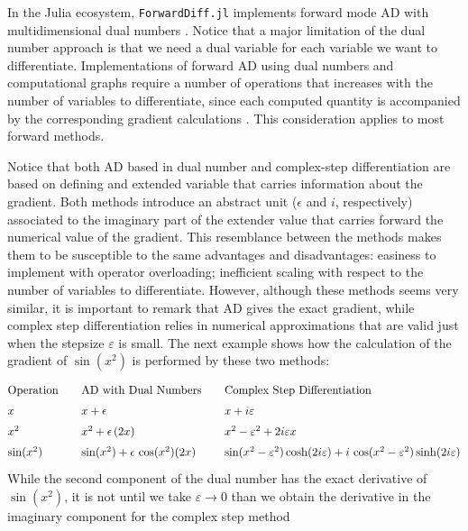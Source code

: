 In the Julia ecosystem, \texttt{ForwardDiff.jl} implements forward mode AD with multidimensional dual numbers \cite{RevelsLubinPapamarkou2016}. 
Notice that a major limitation of the dual number approach is that we need a dual variable for each variable we want to differentiate. 
Implementations of forward AD using dual numbers and computational graphs require a number of operations that increases with the number of variables to differentiate, since each computed quantity is accompanied by the corresponding gradient calculations \cite{Griewack-on-AD}. 
This consideration applies to most forward methods. 

Notice that both AD based in dual number and complex-step differentiation are based on defining and extended variable that carries information about the gradient. 
Both methods introduce an abstract unit ($\epsilon$ and $i$, respectively) associated to the imaginary part of the extender value that carries forward the numerical value of the gradient. 
This resemblance between the methods makes them to be susceptible to the same advantages and disadvantages: easiness to implement with operator overloading; inefficient scaling with respect to the number of variables to differentiate. 
However, although these methods seems very similar, it is important to remark that AD gives the exact gradient, while complex step differentiation relies in numerical approximations that are valid just when the stepsize $\varepsilon$ is small. 
The next example shows how the calculation of the gradient of $\sin (x^2)$ is performed by these two methods:
\begin{equation}
\renewcommand{\arraystretch}{1.5}
\begin{tabular}{@{} l @{\qquad} l @{\qquad} l @{}}
Operation & AD with Dual Numbers  & Complex Step Differentiation \\
$x$ & $x + \epsilon$    & $x + i \varepsilon$ \\
$x^2$ & $x^2 + \epsilon \, (2x)$  & $x^2 - \varepsilon^2 + 2i\varepsilon x$\\
$\sin(x^2)$  & $\sin(x^2) + \epsilon \, \cos(x^2) (2x)$ &
$\sin(x^2 - \varepsilon^2) \cosh (2i\varepsilon) + i \, \cos(x^2 - \varepsilon^2) \sinh (2i\varepsilon)$
\end{tabular}
\label{eq:AD-complex-comparision}
\end{equation}
While the second component of the dual number has the exact derivative of $\sin(x^2)$, it is not until we take $\varepsilon \rightarrow 0$ than we obtain the derivative in the imaginary component for the complex step method
